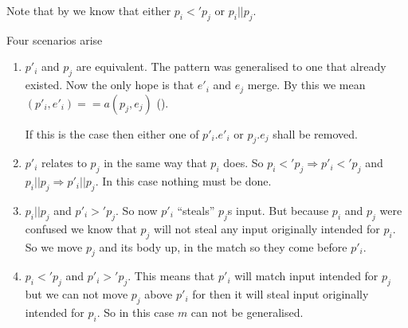 Note that by  we know that either $p_i <' p_j$ or $p_i ||
p_j$.

Four scenarios arise
\begin{enumerate}
\item $p'_i$ and $p_j$ are equivalent. The pattern was generalised to one that
  already existed. Now the only hope is that $e'_i$ and $e_j$ merge. By this we
  mean $(p'_i, e'_i) ==a (p_j, e_j)$ ().

  If this is the case then either one of $p'_i \texttt{.} e'_i$ or $p_j
  \texttt{.} e_j$ shall be removed. \label{item:gen-scen-1}
\item $p'_i$ relates to $p_j$ in the same way that $p_i$ does. So $p_i <' p_j
  \Rightarrow p'_i <' p_j$ and $p_i || p_j \Rightarrow p'_i || p_j$. In this
  case nothing must be done. \label{item:gen-scen-2}
\item $p_i || p_j$ and $p'_i >' p_j$. So now $p'_i$ ``steals'' $p_j$s input. But
  because $p_i$ and $p_j$ were confused we know that $p_j$ will not steal any
  input originally intended for $p_i$. So we move $p_j$ and its body up, in the
  match so they come before $p'_i$. \label{item:gen-scen-3}
\item $p_i <' p_j$ and $p'_i >' p_j$. This means that $p'_i$ will match input
  intended for $p_j$ but we can not move $p_j$ above $p'_i$ for then it will
  steal input originally intended for $p_i$. So in this case $m$ can not be
  generalised. \label{item:gen-scen-4}
\end{enumerate}

